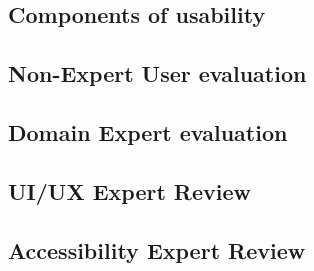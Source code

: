 \subsection{Components of usability}


\subsection{Non-Expert User evaluation}


\newpage
\subsection{Domain Expert evaluation}


\newpage
\subsection{UI/UX Expert Review}


\subsection{Accessibility Expert Review}

